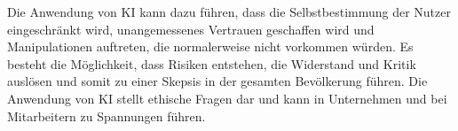 \documentclass{article}
\begin{document}
\vspace{2mm}Die Anwendung von KI kann dazu führen, dass die Selbstbestimmung der Nutzer eingeschränkt wird, unangemessenes Vertrauen geschaffen wird und Manipulationen auftreten, die normalerweise nicht vorkommen würden. Es besteht die Möglichkeit, dass Risiken entstehen, die Widerstand und Kritik auslösen und somit zu einer Skepsis in der gesamten Bevölkerung führen. Die Anwendung von KI stellt ethische Fragen dar und kann in Unternehmen und bei Mitarbeitern zu Spannungen führen.



\printbibliography
\end{document}

